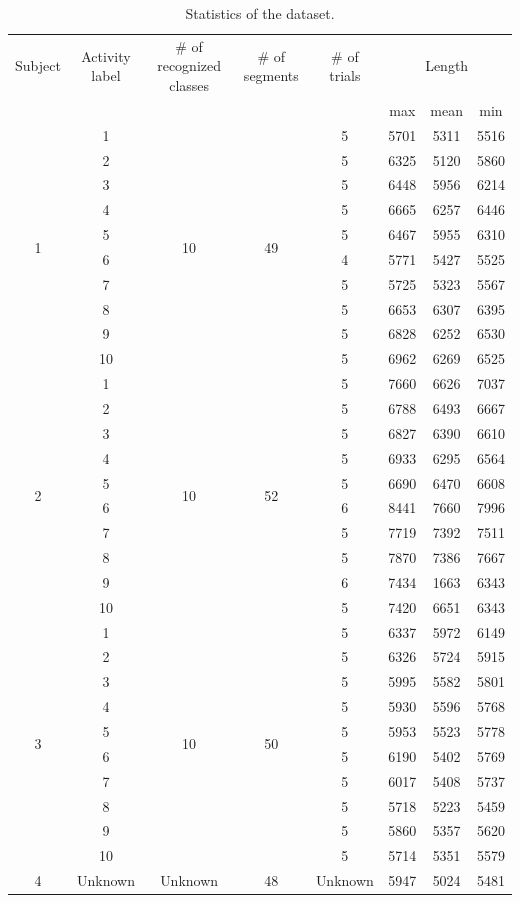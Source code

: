 \documentclass[graybox]{svmult}
\begin{document}
\begin{table}[h]
    \centering
    \caption{Statistics of the dataset.}
    \begin{tabular}{c|c|c|c|c|c|c|c}\hline\hline
    Subject & Activity label& \# of recognized classes & \# of segments & \# of trials & \multicolumn{3}{c}{Length} \\
    &&&&&max&mean&min\\\hline
    \multirow{10}{*}{1} & 1 & \multirow{10}{*}{10} & \multirow{10}{*}{49} & 5 & 5701 & 5311 & 5516\\
    & 2 & & & 5 & 6325 & 5120 & 5860\\
    & 3 & & & 5 & 6448 & 5956 & 6214\\
    & 4 & & & 5 & 6665 & 6257 & 6446\\
    & 5 & & & 5 & 6467 & 5955 & 6310\\
    & 6 & & & 4 & 5771 & 5427 & 5525\\ 
    & 7 & & & 5 & 5725 & 5323 & 5567\\ 
    & 8 & & & 5 & 6653 & 6307 & 6395\\ 
    & 9 & & & 5 & 6828 & 6252 & 6530\\
    & 10 & & & 5 &6962 & 6269 & 6525\\ \hline
    \multirow{10}{*}{2} & 1 & \multirow{10}{*}{10} & \multirow{10}{*}{52} & 5 & 7660 & 6626 & 7037\\
    & 2 & & & 5 & 6788 & 6493 & 6667\\
    & 3 & & & 5 & 6827 & 6390 & 6610\\ 
    & 4 & & & 5 & 6933 & 6295 & 6564\\
    & 5 & & & 5 & 6690 & 6470 & 6608\\
    & 6 & & & 6 & 8441 & 7660 & 7996\\
    & 7 & & & 5 & 7719 & 7392 & 7511\\
    & 8 & & & 5 & 7870 & 7386 & 7667\\ 
    & 9 & & & 6 & 7434 & 1663 & 6343\\
    & 10 & & & 5 &7420 & 6651 & 6343\\ \hline
    \multirow{10}{*}{3} & 1 & \multirow{10}{*}{10} & \multirow{10}{*}{50} & 5 & 6337 & 5972 & 6149\\
    & 2 & & & 5 & 6326 & 5724 & 5915\\
    & 3 & & & 5 & 5995 & 5582 & 5801\\
    & 4 & & & 5 & 5930 & 5596 & 5768\\
    & 5 & & & 5 & 5953 & 5523 & 5778\\
    & 6 & & & 5 & 6190 & 5402 & 5769\\
    & 7 & & & 5 & 6017 & 5408 & 5737\\ 
    & 8 & & & 5 & 5718 & 5223 & 5459\\
    & 9 & & & 5 & 5860 & 5357 & 5620\\
    & 10 & & & 5 &5714 & 5351 & 5579\\ \hline
    4 & Unknown & Unknown & 48 & Unknown & 5947 & 5024 & 5481\\ \hline
    \end{tabular}
    \label{tab:stats}
\end{table}
\end{document}
